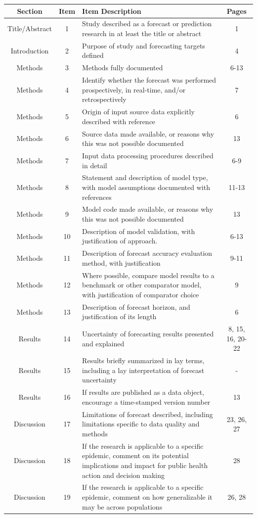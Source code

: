 \documentclass{article}
\begin{document}
\begin{longtable}{c  c  p{9cm}  c}
\toprule
Section & Item & Item Description & Pages \\
\midrule
\endhead
Title/Abstract & 1 & Study described as a forecast or prediction research in at least the title or abstract & 1 \\
\midrule
Introduction & 2 & Purpose of study and forecasting targets defined & 4 \\
\midrule
Methods & 3 & Methods fully documented & 6-13 \\
\midrule
Methods & 4 & Identify whether the forecast was performed prospectively, in real-time, and/or retrospectively & 7 \\
\midrule
Methods & 5 & Origin of input source data explicitly described with reference & 6 \\
\midrule
Methods & 6 & Source data made available, or reasons why this was not possible documented & 13 \\
\midrule
Methods & 7 & Input data processing procedures described in detail & 6-9 \\
\midrule
Methods & 8 & Statement and description of model type, with model assumptions documented with references & 11-13 \\
\midrule
Methods & 9 & Model code made available, or reasons why this was not possible documented & 13 \\
\midrule
Methods & 10 & Description of model validation, with justification of approach. & 6-13 \\
\midrule
Methods & 11 & Description of forecast accuracy evaluation method, with justification & 9-11 \\
\midrule
Methods & 12 & Where possible, compare model results to a benchmark or other comparator model, with justification of comparator choice & 9 \\
\midrule
Methods & 13 & Description of forecast horizon, and justification of its length & 6 \\
\midrule
Results & 14 & Uncertainty of forecasting results presented and explained & 8, 15, 16, 20-22 \\
\midrule
Results & 15 & Results briefly summarized in lay terms, including a lay interpretation of forecast uncertainty & - \\
\midrule
Results & 16 & If results are published as a data object, encourage a time-stamped version number & 13 \\
\midrule
Discussion & 17 & Limitations of forecast described, including limitations specific to data quality and methods & 23, 26, 27 \\
\midrule
Discussion & 18 & If the research is applicable to a specific epidemic, comment on its potential implications and impact for public health action and decision making & 28 \\
\midrule
Discussion & 19 & If the research is applicable to a specific epidemic, comment on how generalizable it may be across populations & 26, 28 \\
\bottomrule
\end{longtable}

\newpage


\end{document}
